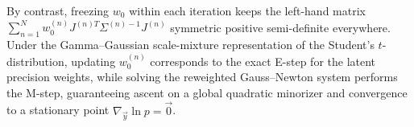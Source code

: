\documentclass[11pt, a4paper]{article}
\begin{document}
By contrast, freezing $w_0$ within each iteration keeps the left-hand matrix $\sum_{n=1}^N w_0^{(n)} J^{(n)T} \Sigma^{(n)-1} J^{(n)}$ symmetric positive semi-definite everywhere. Under the Gamma--Gaussian scale-mixture representation of the Student's $t$-distribution, updating $w_0^{(n)}$ corresponds to the exact E-step for the latent precision weights, while solving the reweighted Gauss--Newton system performs the M-step, guaranteeing ascent on a global quadratic minorizer and convergence to a stationary point $\nabla_{\vec{y}} \ln p = \vec{0}$.
\end{document}
